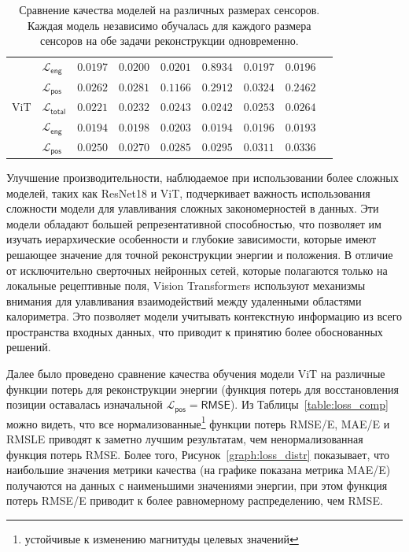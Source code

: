 \documentclass[a4paper,12pt]{extarticle}
\begin{document}
\begin{table}[t]
\begin{tabular}{llrrrrrrr}
        {} & $\mathcal{L}_{\mathsf{eng}}$ & $\mathsf{0.0197}$ & $\mathsf{0.0200}$ & $\mathsf{0.0201}$ & $\mathsf{0.8934}$ & $\mathsf{0.0197}$ & $\mathsf{0.0196}$ \\
        {} & $\mathcal{L}_{\mathsf{pos}}$ & $\mathsf{0.0262}$ & $\mathsf{0.0281}$ & $\mathsf{0.1166}$ & $\mathsf{0.2912}$ & $\mathsf{0.0324}$ & $\mathsf{0.2462}$ \\
        \midrule
        \textsf{ViT} & $\mathcal{L}_{\mathsf{total}}$ & $\mathsf{0.0221}$ & $\mathsf{0.0232}$ & $\mathsf{0.0243}$ & $\mathsf{0.0242}$ & $\mathsf{0.0253}$ & $\mathsf{0.0264}$ \\
        {} & $\mathcal{L}_{\mathsf{eng}}$ & $\mathsf{0.0194}$ & $\mathsf{0.0198}$ & $\mathsf{0.0203}$ & $\mathsf{0.0194}$ & $\mathsf{0.0196}$ & $\mathsf{0.0193}$ \\
        {} & $\mathcal{L}_{\mathsf{pos}}$ & $\mathsf{0.0250}$ & $\mathsf{0.0270}$ & $\mathsf{0.0285}$ & $\mathsf{0.0295}$ & $\mathsf{0.0311}$ & $\mathsf{0.0336}$ \\
        
		\bottomrule
	\end{tabular}
    \caption{Сравнение качества моделей на различных размерах сенсоров. Каждая модель независимо обучалась для каждого размера сенсоров на обе задачи реконструкции одновременно.}
	\label{table:all_models}
\end{table}

Улучшение производительности, наблюдаемое при использовании более сложных моделей, таких как \textsf{ResNet18} и \textsf{ViT}, подчеркивает важность использования сложности модели для улавливания сложных закономерностей в данных. Эти модели обладают большей репрезентативной способностью, что позволяет им изучать иерархические особенности и глубокие зависимости, которые имеют решающее значение для точной реконструкции энергии и положения. В отличие от исключительно сверточных нейронных сетей, которые полагаются только на локальные рецептивные поля, Vision Transformers используют механизмы внимания для улавливания взаимодействий между удаленными областями калориметра. Это позволяет модели учитывать контекстную информацию из всего пространства входных данных, что приводит к принятию более обоснованных решений.

Далее было проведено сравнение качества обучения модели \textsf{ViT} на различные функции потерь для реконструкции энергии (функция потерь для восстановления позиции оставалась изначальной $\mathcal{L}_{\textsf{pos}} = \textsf{RMSE}$). Из Таблицы~\ref{table:loss_comp} можно видеть, что все нормализованные\footnote{устойчивые к изменению магнитуды целевых значений} функции потерь \textsf{RMSE/E}, \textsf{MAE/E} и \textsf{RMSLE} приводят к заметно лучшим результатам, чем ненормализованная функция потерь \textsf{RMSE}. Более того, Рисунок~\ref{graph:loss_distr} показывает, что наибольшие значения метрики качества (на графике показана метрика \textsf{MAE/E}) получаются на данных с наименьшими значениями энергии, при этом функция потерь \textsf{RMSE/E} приводит к более равномерному распределению, чем \textsf{RMSE}.
\end{document}
